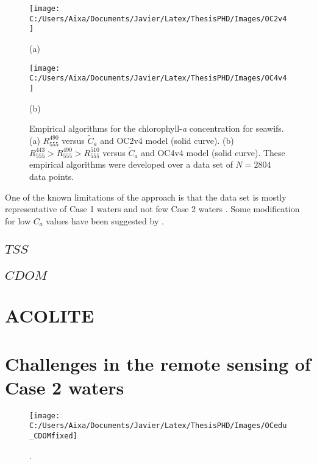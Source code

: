 \begin{figure}[htb]
  \begin{minipage}[c]{0.48\linewidth}
    \centering
      \texttt{[image: C:/Users/Aixa/Documents/Javier/Latex/ThesisPHD/Images/OC2v4]}  
    \centerline{(a)}\medskip
  \end{minipage}
  \hfill
  \begin{minipage}[d]{0.48\linewidth}
    \centering
      \texttt{[image: C:/Users/Aixa/Documents/Javier/Latex/ThesisPHD/Images/OC4v4]}
    \centerline{(b)}\medskip
  \end{minipage}
  \caption{Empirical algorithms for the chlorophyll-{\it a} concentration for \gls{seawifs}. (a) $R_{555}^{490}$ versus $\tilde{C}_a$ and OC2v4 model (solid curve). (b) $R_{555}^{443}>R_{555}^{490}>R_{555}^{510}$ versus $\tilde{C}_a$ and OC4v4 model (solid curve). These empirical algorithms were developed over a data set of $N=2804$ data points. \label{fig:chlemp} } 
\end{figure}

One of the known limitations of the approach is that the data set is mostly representative of Case 1 waters and not few Case 2 waters \cite{OReilly2000}. Some modification for low $C_a$ values have been suggested by \cite{Hu:2012fv}.

\subsection{$TSS$}
\subsection{$CDOM$}

\section{ACOLITE}
\label{subsec:acolite}




\section{Challenges in the remote sensing of Case 2 waters}

\begin{figure}[htb]
\centering
      \texttt{[image: C:/Users/Aixa/Documents/Javier/Latex/ThesisPHD/Images/OCedu\_CDOMfixed]}
      \caption{.\label{fig:CDOMfixed} } 
\end{figure}

